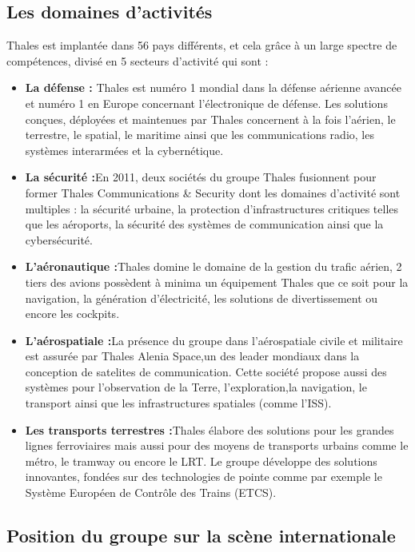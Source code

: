 \subsection{Les domaines d'activités}

Thales est implantée dans 56 pays différents, et cela grâce à un large spectre de compétences, divisé en 5 secteurs d'activité qui sont :
\begin{itemize}
\item \textbf{La défense : }Thales est numéro 1 mondial dans la défense aérienne avancée et numéro 1 en Europe concernant l'électronique de défense. Les solutions conçues, déployées et maintenues par Thales concernent à la fois l'aérien, le terrestre, le spatial, le maritime ainsi que les communications radio, les systèmes interarmées et la cybernétique. 
\item \textbf{La sécurité :}En 2011, deux sociétés du groupe Thales fusionnent pour former Thales Communications \& Security dont les domaines d'activité sont multiples : la sécurité urbaine, la protection d'infrastructures critiques telles que les aéroports, la sécurité des systèmes de communication ainsi que la cybersécurité.
\item \textbf{L'aéronautique :}Thales domine le domaine de la gestion du trafic aérien, 2 tiers des avions possèdent à minima un équipement Thales que ce soit pour la navigation, la génération d'électricité, les solutions de divertissement ou encore les cockpits. 
\item \textbf{L'aérospatiale :}La présence du groupe dans l'aérospatiale civile et militaire est assurée par Thales Alenia Space,un des leader mondiaux dans la conception de satelites de communication. Cette société propose aussi des systèmes pour l'observation de la Terre, l'exploration,la navigation, le transport ainsi que les infrastructures spatiales (comme l'ISS).

\item \textbf{Les transports terrestres :}Thales élabore des solutions pour les grandes lignes ferroviaires mais aussi pour des moyens de transports urbains comme le métro, le tramway ou encore le \gls{LRT}.
Le groupe développe des solutions innovantes, fondées sur des technologies de pointe comme par exemple le Système Européen de Contrôle des Trains (ETCS).
\end{itemize}


\subsection{Position du groupe sur la scène internationale}

